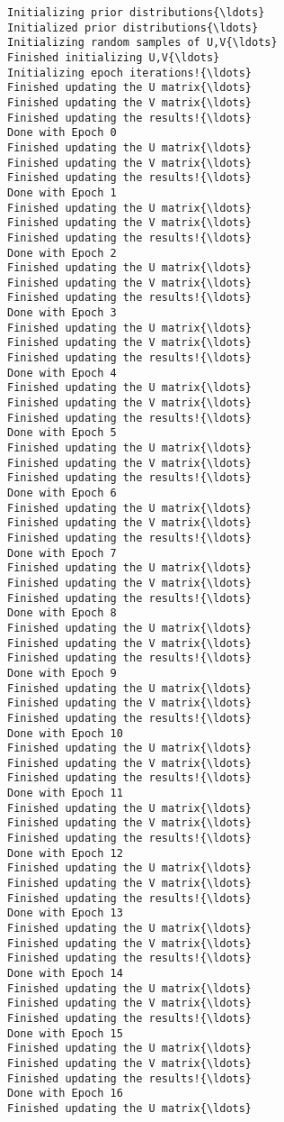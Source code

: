 \documentclass{article}
\begin{document}
    \begin{Verbatim}[commandchars=\\\{\}]
Initializing prior distributions{\ldots}
Initialized prior distributions{\ldots}
Initializing random samples of U,V{\ldots}
Finished initializing U,V{\ldots}
Initializing epoch iterations!{\ldots}
Finished updating the U matrix{\ldots}
Finished updating the V matrix{\ldots}
Finished updating the results!{\ldots}
Done with Epoch 0
Finished updating the U matrix{\ldots}
Finished updating the V matrix{\ldots}
Finished updating the results!{\ldots}
Done with Epoch 1
Finished updating the U matrix{\ldots}
Finished updating the V matrix{\ldots}
Finished updating the results!{\ldots}
Done with Epoch 2
Finished updating the U matrix{\ldots}
Finished updating the V matrix{\ldots}
Finished updating the results!{\ldots}
Done with Epoch 3
Finished updating the U matrix{\ldots}
Finished updating the V matrix{\ldots}
Finished updating the results!{\ldots}
Done with Epoch 4
Finished updating the U matrix{\ldots}
Finished updating the V matrix{\ldots}
Finished updating the results!{\ldots}
Done with Epoch 5
Finished updating the U matrix{\ldots}
Finished updating the V matrix{\ldots}
Finished updating the results!{\ldots}
Done with Epoch 6
Finished updating the U matrix{\ldots}
Finished updating the V matrix{\ldots}
Finished updating the results!{\ldots}
Done with Epoch 7
Finished updating the U matrix{\ldots}
Finished updating the V matrix{\ldots}
Finished updating the results!{\ldots}
Done with Epoch 8
Finished updating the U matrix{\ldots}
Finished updating the V matrix{\ldots}
Finished updating the results!{\ldots}
Done with Epoch 9
Finished updating the U matrix{\ldots}
Finished updating the V matrix{\ldots}
Finished updating the results!{\ldots}
Done with Epoch 10
Finished updating the U matrix{\ldots}
Finished updating the V matrix{\ldots}
Finished updating the results!{\ldots}
Done with Epoch 11
Finished updating the U matrix{\ldots}
Finished updating the V matrix{\ldots}
Finished updating the results!{\ldots}
Done with Epoch 12
Finished updating the U matrix{\ldots}
Finished updating the V matrix{\ldots}
Finished updating the results!{\ldots}
Done with Epoch 13
Finished updating the U matrix{\ldots}
Finished updating the V matrix{\ldots}
Finished updating the results!{\ldots}
Done with Epoch 14
Finished updating the U matrix{\ldots}
Finished updating the V matrix{\ldots}
Finished updating the results!{\ldots}
Done with Epoch 15
Finished updating the U matrix{\ldots}
Finished updating the V matrix{\ldots}
Finished updating the results!{\ldots}
Done with Epoch 16
Finished updating the U matrix{\ldots}
    \end{Verbatim}
\end{document}
